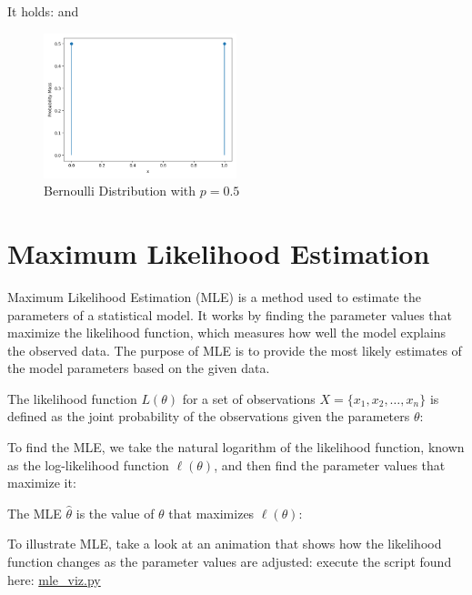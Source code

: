 It holds:
and

\begin{figure}[h]
    \centering
    \includegraphics[width=0.5\textwidth]{../images/plot_bernoulli_distribution.png}
    \caption{Bernoulli Distribution with $p=0.5$}
    \label{fig:bernoulli_distribution}
\end{figure}



\section{Maximum Likelihood Estimation}\label{Maximum Likelihood Estimation}
Maximum Likelihood Estimation (MLE) is a method used to estimate the parameters of a statistical model. It works by finding the parameter values that maximize the likelihood function, which measures how well the model explains the observed data. The purpose of MLE is to provide the most likely estimates of the model parameters based on the given data.

The likelihood function $L(\theta)$ for a set of observations $X = \{x_1, x_2, \ldots, x_n\}$ is defined as the joint probability of the observations given the parameters $\theta$:

To find the MLE, we take the natural logarithm of the likelihood function, known as the log-likelihood function $\ell(\theta)$, and then find the parameter values that maximize it:

The MLE $\hat{\theta}$ is the value of $\theta$ that maximizes $\ell(\theta)$:

To illustrate MLE, take a look at an animation that shows how the likelihood function changes as the parameter values are adjusted: execute the script found here: \href{../scripts/mle_viz.py}{mle\_viz.py}


